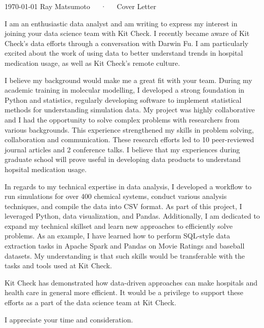 \documentclass[11pt, a4paper]{awesome-cv}
\begin{document}
\makecvheader[R]

\makecvfooter
  {\today}
  {Ray Matsumoto~~~·~~~Cover Letter}
  {}

\makelettertitle

\begin{cvletter}

I am an enthusiastic data analyst and am writing to express my interest in
    joining your data science team with Kit Check.  I recently became aware of
    Kit Check's data efforts through a conversation with Darwin Fu.  I am
    particularly excited about the work of using data to better understand
    trends in hospital medication usage, as well as Kit Check's remote culture.

    I believe my background would make me a great fit with your team.  During my
    academic training in molecular modelling, I developed a strong foundation in
    Python and statistics, regularly developing software to implement
    statistical methods for understanding simulation data.  My project
    was highly collaborative and I had the opportunity to solve complex problems
    with researchers from various backgrounds.  This experience strengthened my
    skills in problem solving, collaboration and communication.  These research
    efforts led to 10 peer-reviewed journal articles and 2 conference talks.  I
    believe that my experiences during graduate school will prove useful in
    developing data products to understand hopsital medication usage.

    In regards to my technical expertise in data analysis, I developed a
    workflow to run simulations for over 400 chemical systems, conduct various
    analysis techniques, and compile the data into CSV format.  As part of this
    project, I leveraged Python, data visualization, and Pandas.  Additionally,
    I am dedicated to expand my technical skillset and learn new approaches to
    efficiently solve problems.  As an example, I have learned how to perform
    SQL-style data extraction tasks in Apache Spark and Pandas on Movie Ratings
    and baseball datasets.  My understanding is that such skills would be
    transferable with the tasks and tools used at Kit Check.

    Kit Check has demonstrated how data-driven approaches can make hospitals and
    health care in general more efficient.  It would be a privilege to support
    these efforts as a part of the data science team at Kit Check.

    I appreciate your time and consideration.


\end{cvletter}


\makeletterclosing
\end{document}
